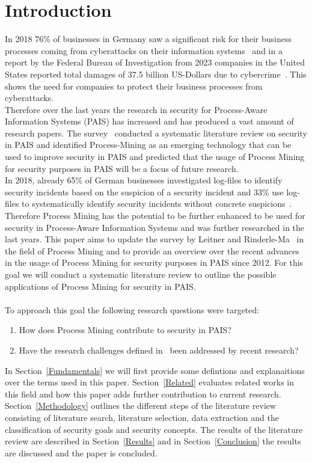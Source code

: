 \documentclass[runningheads]{llncs}
\begin{document}
\section{Introduction}\label{Introduction}
In 2018 76\% of businesses in Germany saw a significant risk for their business processes coming from cyberattacks on their information systems~\cite{Bsi} and in a report by the
Federal Bureau of Investigation from 2023 companies in the
United States reported total damages of 37.5 billion US-Dollars due to cybercrime~\cite{fbi}. This shows the need for companies to protect their business processes from cyberattacks.\\
Therefore over the last years the research in security for Process-Aware Information Systems (PAIS) has increased and has produced a vast amount of research papers. The survey~\cite{Leitner2014273}
conducted a systematic literature review on security in PAIS and identified Process-Mining as an emerging technology that can be used to improve security in PAIS and predicted that
the usage of Process Mining for security purposes in PAIS will be a focus of future research.\\
In 2018, already 65\% of German businesses investigated log-files to identify security incidents based on the suspicion of a security incident and 33\% use log-files to systematically
identify security incidents without concrete suspicions~\cite{Bsi}.\\
Therefore Process Mining has the potential to be further enhanced to be used for security in Process-Aware Information Systems and was further researched in the last years. This paper
aims to update the survey by Leitner and Rinderle-Ma~\cite{Leitner2014273} in the field of Process Mining and to provide an overview over the recent advances in the usage of Process Mining for security purposes in PAIS since 2012. For this goal we will conduct a systematic literature
review to outline the possible applications of Process Mining for security in PAIS.\\
\\
To approach this goal the following research questions were targeted:
\begin{enumerate}
    \item How does Process Mining contribute to security in PAIS\@?
    \item Have the research challenges defined in~\cite{Leitner2014273} been addressed by recent research?
\end{enumerate}

In Section~\ref{Fundamentals} we will first provide some defintions and explanaitions over the terms used in this paper.
Section~\ref{Related} evaluates related works in this field and how this paper adds further contribution to current research.
Section~\ref{Methodology} outlines the different steps of the literature review consisting of literature search, literature selection, data extraction and the classification of security goals and security concepts.
The results of the literature review are described in Section~\ref{Results} and in Section~\ref{Conclusion} the results are discussed and the paper is concluded.
\end{document}
